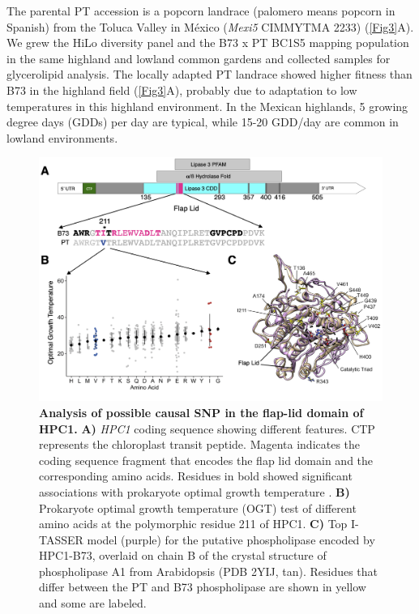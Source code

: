 \documentclass[9pt,twocolumn,twoside,lineno]{biorxiv}
\newcommand{\hpc}{\textit{HPC1}\xspace}
\begin{document}
The parental PT accession is a popcorn landrace (palomero means popcorn in Spanish) from the Toluca Valley in M\'exico (\textit{Mexi5} CIMMYTMA 2233) (\cref{Fig3}A). 
We grew the HiLo diversity panel and the B73 x PT BC1S5 mapping population in the same highland and lowland common gardens and collected samples for glycerolipid analysis.
The locally adapted PT landrace showed higher fitness than B73 in the highland field (\cref{Fig3}A), probably due to adaptation to low temperatures in this highland environment.  
In the Mexican highlands, 5 growing degree days (GDDs) per day are typical, while 15-20 GDD/day are common in lowland environments. 
\begin{figure}[ht]
\centering
\includegraphics[width=0.4\paperwidth]{Figures/Fig_4.png}
\caption{\textbf{Analysis of possible causal SNP in the flap-lid domain of HPC1.} 
\textbf{A)} \hpc coding sequence showing different features. 
CTP represents the chloroplast transit peptide. 
Magenta indicates the coding sequence fragment that encodes the flap lid domain and the corresponding amino acids.
Residues in bold showed significant associations with prokaryote optimal growth temperature \cite{Jensen2021-iv, Jensen2021-zm}.
\textbf{B)} Prokaryote optimal growth temperature (OGT) test of different amino acids at the polymorphic residue 211 of HPC1.
\textbf{C)} Top I-TASSER model (purple) for the putative phospholipase encoded by HPC1-B73, overlaid on chain B of the crystal structure of phospholipase A1 from
Arabidopsis (PDB 2YIJ, tan). 
Residues that differ between the PT and B73 phospholipase are shown in yellow and some are labeled.} 
\label{Fig4}
\end{figure}
\end{document}
